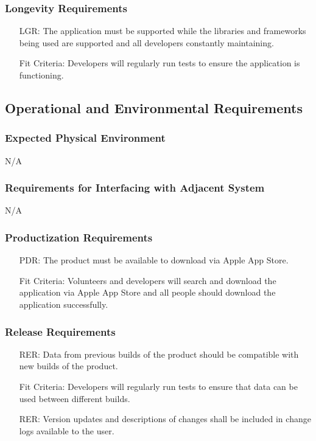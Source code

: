 \documentclass[12pt]{article}
\newcounter{reqnum} %
\newcounter{lgrreqnum} %
\newcounter{pdrreqnum} %
\newcounter{rerreqnum} %
\begin{document}
\subsubsection{Longevity Requirements}
\begin{itemize}
    \item[LGR\refstepcounter{lgrreqnum}\thelgrreqnum \label{R_Inputs}:] The application must be supported while the libraries and frameworks being used are supported and all developers constantly maintaining.
    \item[] Fit Criteria: Developers will regularly run tests to ensure the application is functioning.
\end{itemize}

\subsection{Operational and Environmental Requirements}
\subsubsection{Expected Physical Environment}
N/A

\subsubsection{Requirements for Interfacing with Adjacent System}
N/A

\subsubsection{Productization Requirements}
\begin{itemize}
    \item[PDR\refstepcounter{pdrreqnum}\thepdrreqnum \label{R_Inputs}:] The product must be available to download via Apple App Store.
    \item[] Fit Criteria: Volunteers and developers will search and download the application via Apple App Store and all people should download the application successfully.
\end{itemize}

\subsubsection{Release Requirements}
\begin{itemize}
    \item[RER\refstepcounter{rerreqnum}\thererreqnum \label{R_Inputs}:] Data from previous builds of the product should be compatible with new builds of the product.
    \item[] Fit Criteria: Developers will regularly run tests to ensure that data can be used between different builds.
    \item[RER\refstepcounter{rerreqnum}\thererreqnum \label{R_Inputs}:] Version updates and descriptions of changes shall be included in change logs available to the user.
\end{itemize}
\end{document}
